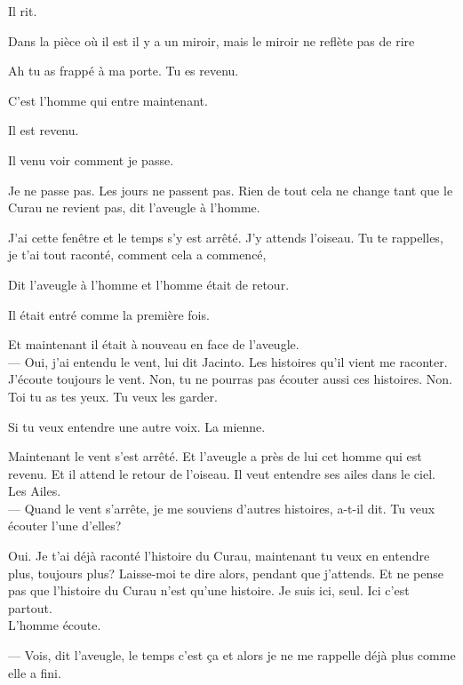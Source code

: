 Il rit.

Dans la pièce où il est il y a un miroir, mais le miroir ne reflète pas
de rire

\clearpage
\thispagestyle{empty}
\movetooddpage

\vspace*{4cm}

Ah tu as frappé à ma porte. Tu es revenu.

C'est l'homme qui entre maintenant.

Il est revenu.

Il venu voir comment je passe.

Je ne passe pas. Les jours ne passent pas. Rien de tout cela ne change
tant que le Curau ne revient pas, dit l'aveugle à l'homme.

J'ai cette fenêtre et le temps s'y est arrêté. J'y attends l'oiseau. Tu
te rappelles, je t'ai tout raconté, comment cela a commencé,

Dit l'aveugle à l'homme et l'homme était de retour.

Il était entré comme la première fois.

Et maintenant il était à nouveau en face de l'aveugle.\\

--- Oui, j'ai entendu le vent, lui dit Jacinto. Les histoires qu'il vient
me raconter. J'écoute toujours le vent. Non, tu ne pourras pas écouter
aussi ces histoires. Non. Toi tu as tes yeux. Tu veux les garder.

Si tu veux entendre une autre voix. La mienne.

\pagebreak

\vspace*{4cm}

Maintenant le vent s'est arrêté. Et l'aveugle a près de lui cet homme
qui est revenu. Et il attend le retour de l'oiseau. Il veut entendre ses
ailes dans le ciel. Les Ailes.\\

--- Quand le vent s'arrête, je me souviens d'autres histoires, a-t-il dit.
Tu veux écouter l'une d'elles?

Oui. Je t'ai déjà raconté l'histoire du Curau, maintenant tu veux en
entendre plus, toujours plus? Laisse-moi te dire alors, pendant que
j'attends. Et ne pense pas que l'histoire du Curau n'est qu'une
histoire. Je suis ici, seul. Ici c'est partout.\\

L'homme écoute.

--- Vois, dit l'aveugle, le temps c'est ça et alors je ne me rappelle déjà
plus comme elle a fini.

